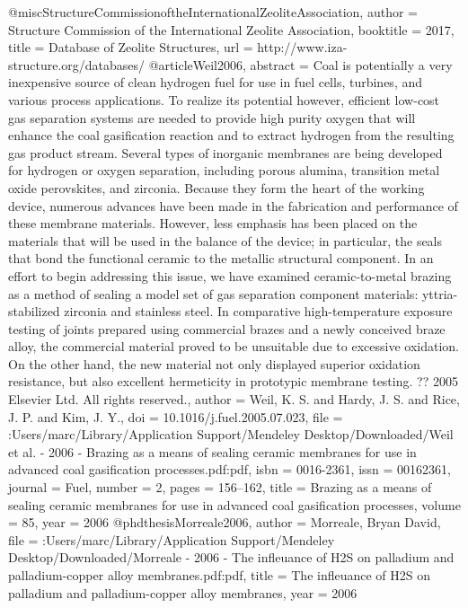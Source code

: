 @misc{StructureCommissionoftheInternationalZeoliteAssociation,
author = {{Structure Commission of the International Zeolite Association}},
booktitle = {2017},
title = {{Database of Zeolite Structures}},
url = {http://www.iza-structure.org/databases/}
}
@article{Weil2006,
abstract = {Coal is potentially a very inexpensive source of clean hydrogen fuel for use in fuel cells, turbines, and various process applications. To realize its potential however, efficient low-cost gas separation systems are needed to provide high purity oxygen that will enhance the coal gasification reaction and to extract hydrogen from the resulting gas product stream. Several types of inorganic membranes are being developed for hydrogen or oxygen separation, including porous alumina, transition metal oxide perovskites, and zirconia. Because they form the heart of the working device, numerous advances have been made in the fabrication and performance of these membrane materials. However, less emphasis has been placed on the materials that will be used in the balance of the device; in particular, the seals that bond the functional ceramic to the metallic structural component. In an effort to begin addressing this issue, we have examined ceramic-to-metal brazing as a method of sealing a model set of gas separation component materials: yttria-stabilized zirconia and stainless steel. In comparative high-temperature exposure testing of joints prepared using commercial brazes and a newly conceived braze alloy, the commercial material proved to be unsuitable due to excessive oxidation. On the other hand, the new material not only displayed superior oxidation resistance, but also excellent hermeticity in prototypic membrane testing. ?? 2005 Elsevier Ltd. All rights reserved.},
author = {Weil, K. S. and Hardy, J. S. and Rice, J. P. and Kim, J. Y.},
doi = {10.1016/j.fuel.2005.07.023},
file = {:Users/marc/Library/Application Support/Mendeley Desktop/Downloaded/Weil et al. - 2006 - Brazing as a means of sealing ceramic membranes for use in advanced coal gasification processes.pdf:pdf},
isbn = {0016-2361},
issn = {00162361},
journal = {Fuel},
number = {2},
pages = {156--162},
title = {{Brazing as a means of sealing ceramic membranes for use in advanced coal gasification processes}},
volume = {85},
year = {2006}
}
@phdthesis{Morreale2006,
author = {Morreale, Bryan David},
file = {:Users/marc/Library/Application Support/Mendeley Desktop/Downloaded/Morreale - 2006 - The infleuance of H2S on palladium and palladium-copper alloy membranes.pdf:pdf},
title = {{The infleuance of H2S on palladium and palladium-copper alloy membranes}},
year = {2006}
}
